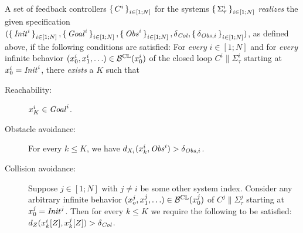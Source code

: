 A set of feedback controllers $\set{C^i}_{i\in [1;N]}$ for the systems $\set{\Sigma_\tau^i}_{i\in [1;N]}$ \emph{realizes} the given specification $(\set{\mathit{Init}^i}_{i\in [1;N]}, \set{\mathit{Goal}^i}_{i\in [1;N]}, \set{\mathit{Obs}^i}_{i\in [1;N]}, \delta_{\mathit{Col}}, \set{\delta_{\mathit{Obs},i}}_{i\in [1;N]})$, as defined above, if the following conditions are satisfied:
For \emph{every} $i\in [1;N]$ and for \emph{every} infinite behavior $(x_0^i,x_1^i,\ldots)\in \mathcal{B}^{\mathrm{CL}}(x_0^i)$ of the closed loop $C^i\parallel \Sigma_\tau^i$ starting at $x_0^i=\mathit{Init}^i$, there \emph{exists} a $K$ such that
\begin{description}
	\item[Reachability:] $x_K^i\in \mathit{Goal}^i$.
	\item[Obstacle avoidance:] For every $k\leq K$, we have $d_{X_i}(x_k^i,\mathit{Obs}^i) > \delta_{\mathit{Obs},i}$.
	\item[Collision avoidance:] 
		Suppose $j\in [1;N]$ with $j\neq i$ be some other system index.
		Consider any arbitrary infinite behavior $(x_o^j, x_1^j,\ldots)\in \mathcal{B}^{\mathrm{CL}}(x_0^j)$ of $C^j\parallel \Sigma_\tau^j$ starting at $x_0^j=\mathit{Init}^j$. 
		Then for every $k\leq K$ we require the following to be satisfied: $d_{Z}(x^i_k[Z],x^j_k[Z])>\delta_{\mathit{Col}}$.
\end{description}


